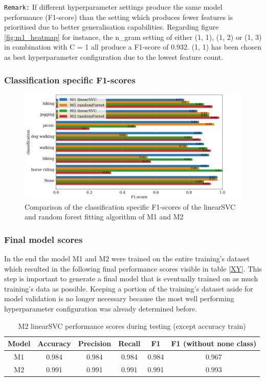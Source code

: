 \texttt{Remark:} If different hyperparameter settings produce the same model performance (F1-score) than the setting which produces fewer features is prioritised due to better generalisation capabilities. Regarding figure \ref{fig:m1_heatmap} for instance, the n\_gram setting of either (1, 1), (1, 2) or (1, 3) in combination with C = 1 all produce a F1-score of 0.932. (1, 1) has been chosen as best hyperparameter configuration due to the lowest feature count.

\subsubsection{Classification specific F1-scores}

\begin{figure}[h!]
   \centering
   \includegraphics[width=\textwidth]{img/m1_m2_class_f1_scores_bigger_font.pdf}
   \caption{Comparison of the classification specific F1-scores of the linearSVC and random forest fitting algorithm of M1 and M2}
   \label{fig:m1_m2_class_f1_scores}
\end{figure}

\subsubsection{Final model scores}
In the end the model M1 and M2 were trained on the entire training's dataset which resulted in the following final performance scores visible in table \ref{XY}. This step is important to generate a final model that is eventually trained on as much training's data as possible. Keeping a portion of the training's dataset aside for model validation is no longer necessary because the most well performing hyperparameter configuration was already determined before.

\begin{table}[h]
\begin{center}
\caption{M2 linearSVC performance scores during testing (except accuracy train)}\vspace{1ex}
\label{tab:m2_linearSVC_bestscores}
\begin{tabular}{cccccc}\hline
Model & Accuracy & Precision & Recall & F1 & F1 (without none class)\\ \hline
M1 & 0.984 & 0.984 & 0.984 & 0.984 & 0.967 \\
M2 & 0.991 & 0.991 & 0.991 & 0.991 & 0.993 \\ \hline
\end{tabular}
\end{center}
\end{table}

